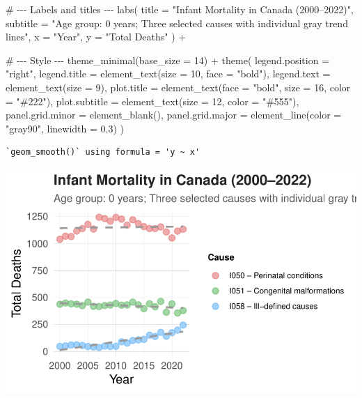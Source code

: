 \documentclass[
  letterpaper,
  DIV=11,
  numbers=noendperiod]{scrartcl}
\newenvironment{Shaded}{\begin{snugshade}}{\end{snugshade}}
\newcommand{\AttributeTok}[1]{\textcolor[rgb]{0.40,0.45,0.13}{#1}}
\newcommand{\CommentTok}[1]{\textcolor[rgb]{0.37,0.37,0.37}{#1}}
\newcommand{\DecValTok}[1]{\textcolor[rgb]{0.68,0.00,0.00}{#1}}
\newcommand{\FloatTok}[1]{\textcolor[rgb]{0.68,0.00,0.00}{#1}}
\newcommand{\FunctionTok}[1]{\textcolor[rgb]{0.28,0.35,0.67}{#1}}
\newcommand{\NormalTok}[1]{\textcolor[rgb]{0.00,0.23,0.31}{#1}}
\newcommand{\SpecialCharTok}[1]{\textcolor[rgb]{0.37,0.37,0.37}{#1}}
\newcommand{\StringTok}[1]{\textcolor[rgb]{0.13,0.47,0.30}{#1}}
\begin{document}
\begin{Shaded}
\begin{Highlighting}[]
  \CommentTok{\# {-}{-}{-} Labels and titles {-}{-}{-}}
  \FunctionTok{labs}\NormalTok{(}
    \AttributeTok{title =} \StringTok{"Infant Mortality in Canada (2000–2022)"}\NormalTok{,}
    \AttributeTok{subtitle =} \StringTok{"Age group: 0 years; Three selected causes with individual gray trend lines"}\NormalTok{,}
    \AttributeTok{x =} \StringTok{"Year"}\NormalTok{,}
    \AttributeTok{y =} \StringTok{"Total Deaths"}
\NormalTok{  ) }\SpecialCharTok{+}
  
  \CommentTok{\# {-}{-}{-} Style {-}{-}{-}}
  \FunctionTok{theme\_minimal}\NormalTok{(}\AttributeTok{base\_size =} \DecValTok{14}\NormalTok{) }\SpecialCharTok{+}
  \FunctionTok{theme}\NormalTok{(}
    \AttributeTok{legend.position =} \StringTok{"right"}\NormalTok{,}
    \AttributeTok{legend.title =} \FunctionTok{element\_text}\NormalTok{(}\AttributeTok{size =} \DecValTok{10}\NormalTok{, }\AttributeTok{face =} \StringTok{"bold"}\NormalTok{),}
    \AttributeTok{legend.text =} \FunctionTok{element\_text}\NormalTok{(}\AttributeTok{size =} \DecValTok{9}\NormalTok{),}
    \AttributeTok{plot.title =} \FunctionTok{element\_text}\NormalTok{(}\AttributeTok{face =} \StringTok{"bold"}\NormalTok{, }\AttributeTok{size =} \DecValTok{16}\NormalTok{, }\AttributeTok{color =} \StringTok{"\#222"}\NormalTok{),}
    \AttributeTok{plot.subtitle =} \FunctionTok{element\_text}\NormalTok{(}\AttributeTok{size =} \DecValTok{12}\NormalTok{, }\AttributeTok{color =} \StringTok{"\#555"}\NormalTok{),}
    \AttributeTok{panel.grid.minor =} \FunctionTok{element\_blank}\NormalTok{(),}
    \AttributeTok{panel.grid.major =} \FunctionTok{element\_line}\NormalTok{(}\AttributeTok{color =} \StringTok{"gray90"}\NormalTok{, }\AttributeTok{linewidth =} \FloatTok{0.3}\NormalTok{)}
\NormalTok{  )}
\end{Highlighting}
\end{Shaded}

\begin{verbatim}
`geom_smooth()` using formula = 'y ~ x'
\end{verbatim}

\includegraphics{paper_files/figure-pdf/unnamed-chunk-5-1.pdf}
\end{document}
